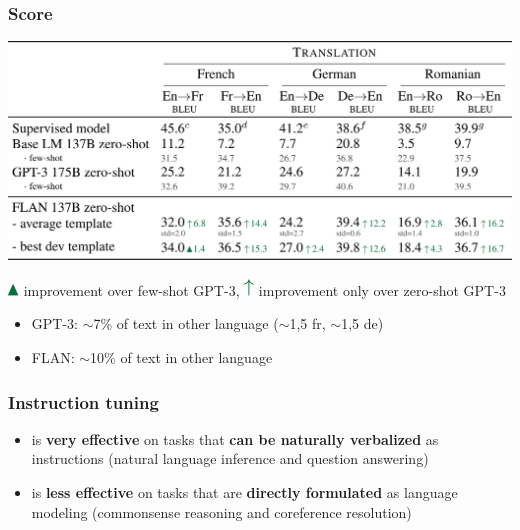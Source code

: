 \documentclass{beamer}
\begin{document}
\begin{frame}
    \frametitle{Score}
    \begin{center}
        \includegraphics[scale=1.05]{img/score_translation.png}
    \end{center}
    \tiny{\includegraphics[scale=1.0]{img/up_arrow_1.png} improvement over few-shot GPT-3, \includegraphics[scale=1.0]{img/up_arrow_2.png} improvement only over zero-shot GPT-3}
    \begin{itemize}
    \footnotesize 
        \item GPT-3: $\sim$7\% of text in other language ($\sim$1,5 fr, $\sim$1,5 de)
        \item FLAN: $\sim$10\% of text in other language
    \end{itemize}
\end{frame}

\begin{frame}
    \frametitle{Instruction tuning}
    \begin{itemize}
        \item is \textbf{very effective} on tasks that \textbf{can be naturally verbalized} as instructions (natural language inference and question answering)
        \item is \textbf{less effective} on tasks that are \textbf{directly formulated} as language modeling (commonsense reasoning and coreference resolution)
    \end{itemize}
\end{frame}
\end{document}

